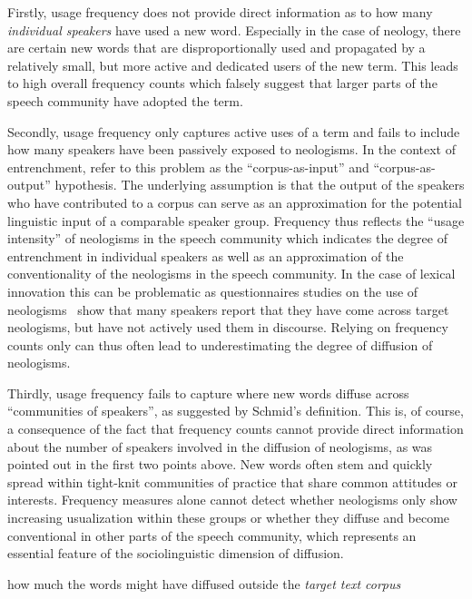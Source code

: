 \documentclass[
  a4paper,
  abstract=on,
  captions=tableabove
  ]{scrartcl}
\begin{document}
  Firstly, usage frequency does not provide direct information as to how many \emph{individual speakers} have used a new word. Especially in the case of neology, there are certain new words that are disproportionally used and propagated by a relatively small, but more active and dedicated users of the new term. This leads to high overall frequency counts which falsely suggest that larger parts of the speech community have adopted the term.

  Secondly, usage frequency only captures active uses of a term and fails to include how many speakers have been passively exposed to neologisms. In the context of entrenchment, \textcite{Stefanowitsch2017CorpusbasedPerspective} refer to this problem as the \enquote{corpus-as-input} and \enquote{corpus-as-output} hypothesis. The underlying assumption is that the output of the speakers who have contributed to a corpus can serve as an approximation for the potential linguistic input of a comparable speaker group. Frequency thus reflects the \enquote{usage intensity} of neologisms in the speech community which indicates the degree of entrenchment in individual speakers as well as an approximation of the conventionality of the neologisms in the speech community. In the case of lexical innovation this can be problematic as questionnaires studies on the use of neologisms~\parencite{Kerremans2015WebNew} show that many speakers report that they have come across target neologisms, but have not actively used them in discourse. Relying on frequency counts only can thus often lead to underestimating the degree of diffusion of neologisms.

  Thirdly, usage frequency fails to capture where new words diffuse across \enquote{communities of speakers}, as suggested by Schmid's definition. This is, of course, a consequence of the fact that frequency counts cannot provide direct information about the number of speakers involved in the diffusion of neologisms, as was pointed out in the first two points above. New words often stem and quickly spread within tight-knit communities of practice that share common attitudes or interests. Frequency measures alone cannot detect whether neologisms only show increasing usualization within these groups or whether they diffuse and become conventional in other parts of the speech community, which represents an essential feature of the sociolinguistic dimension of diffusion.


  how much the words might have diffused outside the \emph{target text corpus}
\end{document}
